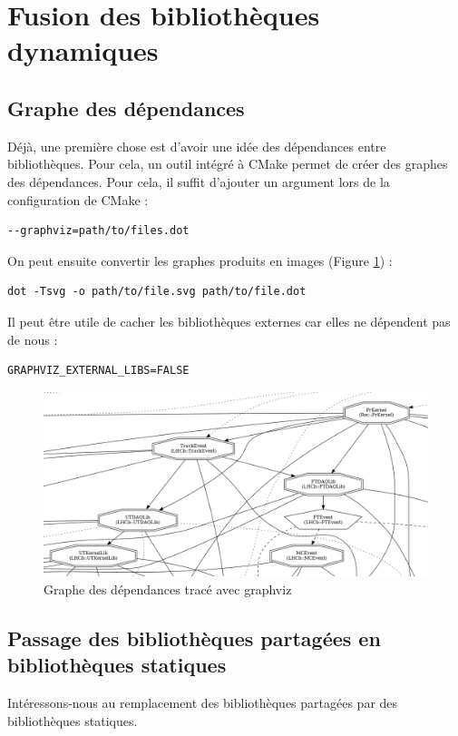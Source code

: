 \documentclass[a4paper]{report}
\begin{document}
\section{Fusion des bibliothèques dynamiques}

\subsection{Graphe des dépendances}
Déjà, une première chose est d'avoir une idée des dépendances entre bibliothèques.
Pour cela, un outil intégré à CMake permet de créer des graphes des dépendances.
Pour cela, il suffit d'ajouter un argument lors de la configuration de CMake :
\begin{verbatim}
--graphviz=path/to/files.dot
\end{verbatim}

On peut ensuite convertir les graphes produits en images (Figure \ref{Graphviz}) :
\begin{verbatim}
dot -Tsvg -o path/to/file.svg path/to/file.dot
\end{verbatim}

Il peut être utile de cacher les bibliothèques externes car elles ne dépendent pas de nous :
\begin{verbatim}
GRAPHVIZ_EXTERNAL_LIBS=FALSE
\end{verbatim}

\begin{figure}[!htb]
    \includegraphics[width=\textwidth]{graphviz_cropped.png}
    \caption{Graphe des dépendances tracé avec graphviz}
    \label{Graphviz}
\end{figure}

\subsection{Passage des bibliothèques partagées en bibliothèques statiques}
Intéressons-nous au remplacement des bibliothèques partagées par des bibliothèques statiques.
\end{document}
